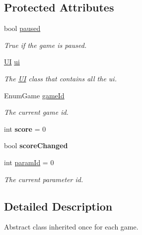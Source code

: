 \subsection*{Protected Attributes}
\begin{DoxyCompactItemize}
\item 
bool \hyperlink{class_game_state_adf311d7d919e9b18af99cfb91060b325}{paused}
\begin{DoxyCompactList}\small\item\em True if the game is paused.\end{DoxyCompactList}\item 
\hyperlink{class_u_i}{U\-I} \hyperlink{class_game_state_a60e73f2ff4aa85124129d5ab6331a0c4}{ui}
\begin{DoxyCompactList}\small\item\em The \hyperlink{class_u_i}{U\-I} class that contains all the ui.\end{DoxyCompactList}\item 
Enum\-Game \hyperlink{class_game_state_ad7d6224b63a573579b940b0767e996b4}{game\-Id}
\begin{DoxyCompactList}\small\item\em The current game id.\end{DoxyCompactList}\item 
\hypertarget{class_game_state_a4fe4a8e031245467b1e5fb655ae5cf50}{int {\bfseries score} = 0}\label{class_game_state_a4fe4a8e031245467b1e5fb655ae5cf50}

\item 
\hypertarget{class_game_state_a3e08b2fcdc571afd95e5aa8022000225}{bool {\bfseries score\-Changed}}\label{class_game_state_a3e08b2fcdc571afd95e5aa8022000225}

\item 
int \hyperlink{class_game_state_abac5b81af203197b6e336ef57dd1e6f1}{param\-Id} = 0
\begin{DoxyCompactList}\small\item\em The current parameter id.\end{DoxyCompactList}\end{DoxyCompactItemize}


\subsection{Detailed Description}
Abstract class inherited once for each game.



